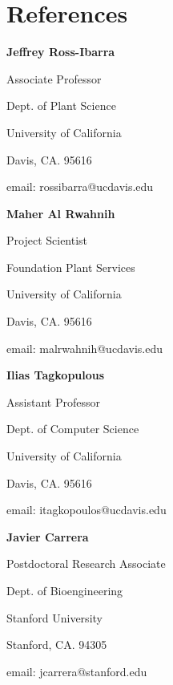 \documentclass[letterpaper]{article}
\def\footerlink{https://github.com/arundurvasula/CV/blob/master/CV.pdf?raw=true}
\renewenvironment{itemize}{
  \begin{list}{}{
    \setlength{\leftmargin}{1.5em}
  }
}{
  \end{list}
}
\begin{document}
\section*{References}
\begin{itemize}
\item {\bf Jeffrey Ross-Ibarra}
\begin{itemize}
\item Associate Professor
\item Dept. of Plant Science
\item University of California
\item Davis, CA. 95616
\item email: rossibarra@ucdavis.edu 
\end{itemize}
\item {\bf Maher Al Rwahnih}
\begin{itemize}
\item Project Scientist
\item Foundation Plant Services
\item University of California
\item Davis, CA. 95616
\item email: malrwahnih@ucdavis.edu 
\end{itemize}
\item {\bf Ilias Tagkopulous}
\begin{itemize}
\item Assistant Professor
\item Dept. of Computer Science
\item University of California
\item Davis, CA. 95616
\item email: itagkopoulos@ucdavis.edu 
\end{itemize}
\item {\bf Javier Carrera}
\begin{itemize}
\item Postdoctoral Research Associate
\item Dept. of Bioengineering
\item Stanford University
\item Stanford, CA. 94305
\item email: jcarrera@stanford.edu
\end{itemize}
\end{itemize}

\end{document}
